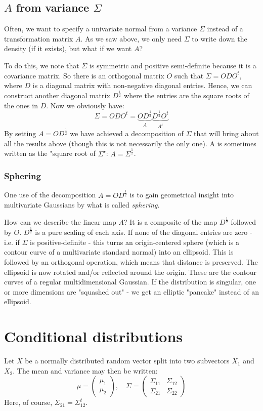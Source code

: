 \documentclass[12pt, a4paper]{article}
\numberwithin{equation}{section}
\begin{document}
\subsection{$A$ from variance $\Sigma$}
Often, we want to specify a univariate normal from a variance $\Sigma$ instead of a transformation matrix $A$. As we saw above, we only need $\Sigma$ to write down the density (if it exists), but what if we want $A$?

To do this, we note that $\Sigma$ is symmetric and positive semi-definite because it is a covariance matrix. So there is an orthogonal matrix $O$ such that $\Sigma=ODO^t$, where $D$ is a diagonal matrix with non-negative diagonal entries. Hence, we can construct another diagonal matrix $D^{\frac{1}{2}}$ where the entries are the square roots of the ones in $D$. Now we obviously have:
\begin{equation}
\Sigma=ODO^t=\underbrace{OD^{\frac{1}{2}}}_{A}\underbrace{D^{\frac{1}{2}}O^t}_{A^t}
\end{equation}
By setting $A=OD^{\frac{1}{2}}$ we have achieved a decomposition of $\Sigma$ that will bring about all the results above (though this is not necessarily the only one). A is sometimes written as the "square root of $\Sigma$": $A=\Sigma^{\frac{1}{2}}$.

\subsubsection{Sphering}
One use of the decomposition $A=OD^{\frac{1}{2}}$ is to gain geometrical insight into multivariate Gaussians by what is called \textit{sphering}.

How can we describe the linear map $A$? It is a composite of the map $D^{\frac{1}{2}}$ followed by $O$. $D^{\frac{1}{2}}$ is a pure scaling of each axis. If none of the diagonal entries are zero - i.e. if $\Sigma$ is positive-definite - this turns an origin-centered sphere (which is a contour curve of a multivariate standard normal) into an ellipsoid. This is followed by an orthogonal operation, which means that distance is preserved. The ellipsoid is now rotated and/or reflected around the origin. These are the contour curves of a regular multidimensional Gaussian. If the distribution is singular, one or more dimensions are "squashed out" - we get an elliptic "pancake" instead of an ellipsoid.

\section{Conditional distributions}
Let $X$ be a normally distributed random vector split into two subvectors $X_1$ and $X_2$. The mean and variance may then be written:
\begin{equation}
\mu=
\begin{pmatrix}
\mu_1 \\ \mu_2
\end{pmatrix},\quad
\Sigma=
\begin{pmatrix}
\Sigma_{11}	& \Sigma_{12}	\\
\Sigma_{21}	& \Sigma_{22}
\end{pmatrix}
\end{equation}
Here, of course, $\Sigma_{21}=\Sigma_{12}^t$.
\end{document}
